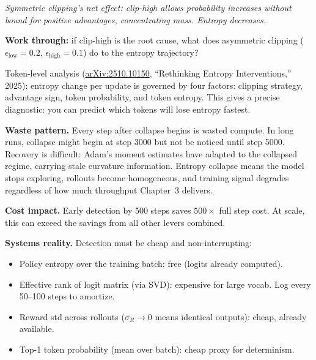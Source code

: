 \begin{thinkfirst}
\begin{center}
\end{center}

\smallskip
\noindent\textit{Symmetric clipping's net effect: clip-high allows probability increases without bound for positive advantages, concentrating mass. Entropy decreases.}

\textbf{Work through:} if clip-high is the root cause, what does asymmetric clipping ($\epsilon_{\mathrm{low}} = 0.2$, $\epsilon_{\mathrm{high}} = 0.1$) do to the entropy trajectory?
\end{thinkfirst}

Token-level analysis (\href{https://arxiv.org/abs/2510.10150}{arXiv:2510.10150}, ``Rethinking Entropy Interventions,'' 2025): entropy change per update is governed by four factors: clipping strategy, advantage sign, token probability, and token entropy. This gives a precise diagnostic: you can predict which tokens will lose entropy fastest.

\textbf{Waste pattern.} Every step after collapse begins is wasted compute. In long runs, collapse might begin at step 3000 but not be noticed until step 5000. Recovery is difficult: Adam's moment estimates have adapted to the collapsed regime, carrying stale curvature information. Entropy collapse means the model stops exploring, rollouts become homogeneous, and training signal degrades regardless of how much throughput Chapter~3 delivers.

\textbf{Cost impact.} Early detection by 500 steps saves $500 \times$ full step cost. At scale, this can exceed the savings from all other levers combined.

\textbf{Systems reality.} Detection must be cheap and non-interrupting:
\begin{itemize}
  \item Policy entropy over the training batch: free (logits already computed).
  \item Effective rank of logit matrix (via SVD): expensive for large vocab. Log every 50--100 steps to amortize.
  \item Reward std across rollouts ($\sigma_R \to 0$ means identical outputs): cheap, already available.
  \item Top-1 token probability (mean over batch): cheap proxy for determinism.
\end{itemize}

